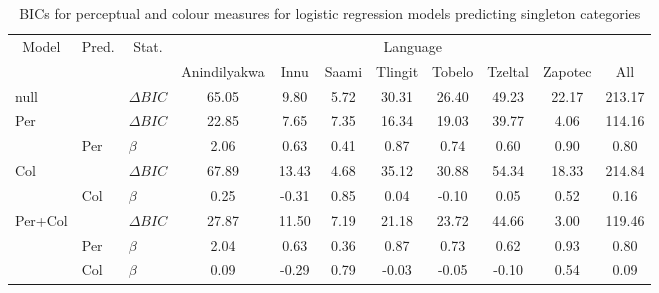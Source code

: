 \begin{table}[!h]

\caption{\label{tab:table:resultsLR}BICs for perceptual and colour measures for logistic regression models predicting singleton categories}
\centering
\begin{tabular}[t]{lllcccccccc}
\toprule
\multicolumn{1}{c}{Model} & \multicolumn{1}{c}{Pred.} & \multicolumn{1}{c}{Stat.} & \multicolumn{8}{c}{Language} \\
\cmidrule(l{3pt}r{3pt}){1-1} \cmidrule(l{3pt}r{3pt}){2-2} \cmidrule(l{3pt}r{3pt}){3-3} \cmidrule(l{3pt}r{3pt}){4-11}
  &    &     & Anindilyakwa & Innu & Saami & Tlingit & Tobelo & Tzeltal & Zapotec & All\\
\midrule
null &  & $\Delta BIC$ & 65.05 & 9.80 & 5.72 & 30.31 & 26.40 & 49.23 & 22.17 & 213.17\\
Per &  & $\Delta BIC$ & 22.85 & 7.65 & 7.35 & 16.34 & 19.03 & 39.77 & 4.06 & 114.16\\
 & Per & $\beta$ & 2.06 & 0.63 & 0.41 & 0.87 & 0.74 & 0.60 & 0.90 & 0.80\\
Col &  & $\Delta BIC$ & 67.89 & 13.43 & 4.68 & 35.12 & 30.88 & 54.34 & 18.33 & 214.84\\
 & Col & $\beta$ & 0.25 & -0.31 & 0.85 & 0.04 & -0.10 & 0.05 & 0.52 & 0.16\\
Per+Col &  & $\Delta BIC$ & 27.87 & 11.50 & 7.19 & 21.18 & 23.72 & 44.66 & 3.00 & 119.46\\
 & Per & $\beta$ & 2.04 & 0.63 & 0.36 & 0.87 & 0.73 & 0.62 & 0.93 & 0.80\\
 & Col & $\beta$ & 0.09 & -0.29 & 0.79 & -0.03 & -0.05 & -0.10 & 0.54 & 0.09\\
\bottomrule
\end{tabular}
\end{table}
